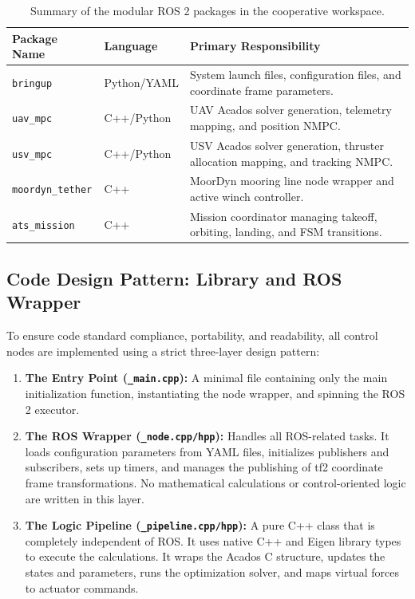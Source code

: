     \begin{table}[H]
    \centering
    \caption{Summary of the modular ROS 2 packages in the cooperative workspace.}
    \begin{tabular}{llp{7.5cm}}
    \toprule
    Package Name & Language & Primary Responsibility \\
    \midrule
    \texttt{bringup} & Python/YAML & System launch files, configuration files, and coordinate frame parameters. \\
    \texttt{uav\_mpc} & C++/Python & UAV Acados solver generation, telemetry mapping, and position NMPC. \\
    \texttt{usv\_mpc} & C++/Python & USV Acados solver generation, thruster allocation mapping, and tracking NMPC. \\
    \texttt{moordyn\_tether} & C++ & MoorDyn mooring line node wrapper and active winch controller. \\
    \texttt{ats\_mission} & C++ & Mission coordinator managing takeoff, orbiting, landing, and FSM transitions. \\
    \bottomrule
    \end{tabular}
    \label{tab:ros_packages}
    \end{table}

    \subsection{Code Design Pattern: Library and ROS Wrapper}
    To ensure code standard compliance, portability, and readability, all control nodes are implemented using a strict three-layer design pattern:
    \begin{enumerate}
        \item \textbf{The Entry Point (\texttt{\_main.cpp}):} A minimal file containing only the main initialization function, instantiating the node wrapper, and spinning the ROS 2 executor.
        \item \textbf{The ROS Wrapper (\texttt{\_node.cpp/hpp}):} Handles all ROS-related tasks. It loads configuration parameters from YAML files, initializes publishers and subscribers, sets up timers, and manages the publishing of tf2 coordinate frame transformations. No mathematical calculations or control-oriented logic are written in this layer.
        \item \textbf{The Logic Pipeline (\texttt{\_pipeline.cpp/hpp}):} A pure C++ class that is completely independent of ROS. It uses native C++ and Eigen library types to execute the calculations. It wraps the Acados C structure, updates the states and parameters, runs the optimization solver, and maps virtual forces to actuator commands.
    \end{enumerate}

